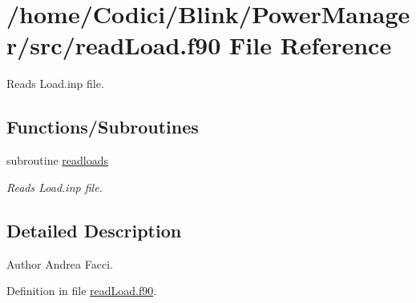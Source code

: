 \hypertarget{read_load_8f90}{\section{/home/\-Codici/\-Blink/\-Power\-Manager/src/read\-Load.f90 File Reference}
\label{read_load_8f90}
}


Reads Load.\-inp file.  


\subsection*{Functions/\-Subroutines}
\begin{DoxyCompactItemize}
\item 
subroutine \hyperlink{read_load_8f90_a7cfc2afc3abd098872413af5bb794e4c}{readloads}
\begin{DoxyCompactList}\small\item\em Reads Load.\-inp file. \end{DoxyCompactList}\end{DoxyCompactItemize}


\subsection{Detailed Description}
\begin{DoxyAuthor}{Author}
Andrea Facci. 
\end{DoxyAuthor}


Definition in file \hyperlink{read_load_8f90_source}{read\-Load.\-f90}.



